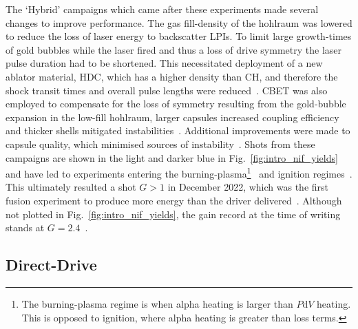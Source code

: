 The `Hybrid' campaigns which came after these experiments made several changes to improve performance.
The gas fill-density of the hohlraum was lowered to reduce the loss of laser energy to backscatter \ac{LPIs}.
To limit large growth-times of gold bubbles while the laser fired and thus a loss of drive symmetry the laser pulse duration had to be shortened.
This necessitated deployment of a new ablator material, \ac{HDC}, which has a higher density than CH, and therefore the shock transit times and overall pulse lengths were reduced~\cite{mackinnon_highdensity_2014}.
\ac{CBET} was also employed to compensate for the loss of symmetry resulting from the gold-bubble expansion in the low-fill hohlraum, larger capsules increased coupling efficiency and thicker shells mitigated instabilities~\cite{zylstra_record_2021}.
Additional improvements were made to capsule quality, which minimised sources of instability~\cite{kritcher_design_2024}.
Shots from these campaigns are shown in the light and darker blue in Fig.~\ref{fig:intro_nif_yields} and have led to experiments entering the burning-plasma\footnote{The burning-plasma regime is when alpha heating is larger than $P\text{d}V$ heating. This is opposed to ignition, where alpha heating is greater than loss terms.}~\cite{zylstra_burning_2022,kritcher_design_2022} and ignition regimes~\cite{abu-shawareb_lawson_2022}.
This ultimately resulted a shot $G>1$ in December 2022, which was the first fusion experiment to produce more energy than the driver delivered~\cite{abu-shawareb_achievement_2024}.
Although not plotted in Fig.~\ref{fig:intro_nif_yields}, the gain record at the time of writing stands at $G=2.4$~\cite{_nif_}.

\subsection{Direct-Drive}%
\label{sec:intro_direct}

